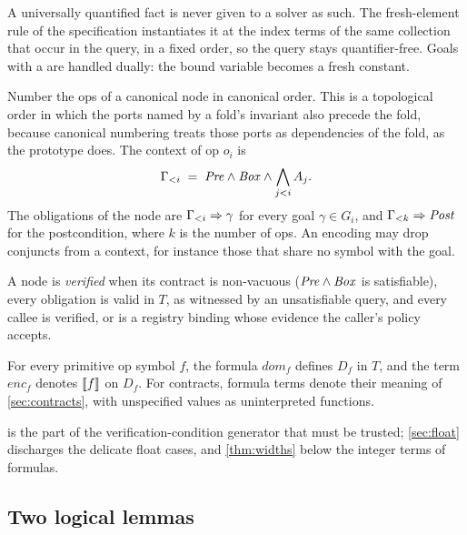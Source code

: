 A universally quantified fact is never given to a solver as such. The fresh-element rule of the
specification instantiates it at the index terms of the same collection that occur in the
query, in a fixed order, so the query stays quantifier-free. Goals with a  are
handled dually: the bound variable becomes a fresh constant.

\begin{definition}\label{def:ordered}
Number the ops of a canonical node in canonical order. This is a topological order in which the
ports named by a fold's invariant also precede the fold, because canonical numbering treats
those ports as dependencies of the fold, as the prototype does. The context of op $o_i$ is
\[
\Gamma_{<i} \;=\; \mathit{Pre}\wedge\mathit{Box}\wedge\bigwedge_{j<i}A_j .
\]
The obligations of the node are $\Gamma_{<i}\Rightarrow\gamma$ for every goal $\gamma\in G_i$,
and $\Gamma_{<k}\Rightarrow\mathit{Post}$ for the postcondition, where $k$ is the number of ops. An
encoding may drop conjuncts from a context, for instance those that share no symbol with the
goal.
\end{definition}

\begin{definition}\label{def:verified}
A node is \emph{verified} when its contract is non-vacuous ($\mathit{Pre}\wedge\mathit{Box}$ is
satisfiable), every obligation is valid in $T$, as witnessed by an unsatisfiable query, and
every callee is verified, or is a registry binding whose evidence the caller's policy accepts.
\end{definition}

\begin{assumption}\label{ass:faithful}
For every primitive op symbol $f$, the formula $\mathit{dom}_f$ defines $D_f$ in $T$, and the
term $\mathit{enc}_f$ denotes $\llbracket f \rrbracket$ on $D_f$. For contracts, formula terms denote their
meaning of \cref{sec:contracts}, with unspecified values as uninterpreted functions.
\end{assumption}

 is the part of the verification-condition generator that must be trusted;
\cref{sec:float} discharges the delicate float cases, and \cref{thm:widths} below the integer
terms of formulas.

\subsection{Two logical lemmas}


